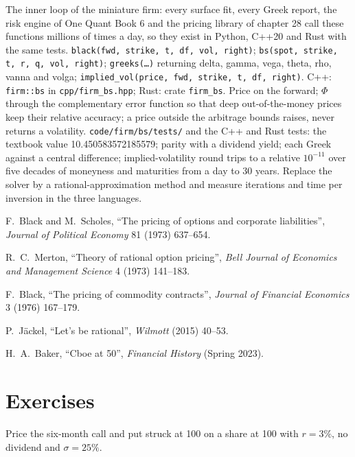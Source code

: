 \begin{build}
 The inner loop of the miniature firm: every surface fit, every
Greek report, the risk engine of One Quant Book 6 and the pricing library of
chapter 28 call these functions millions of times a day, so they exist in
Python, C++20 and Rust with the same tests.
 \texttt{black(fwd, strike, t, df, vol, right)};
\texttt{bs(spot, strike, t, r, q, vol, right)}; \texttt{greeks(\ldots)} returning
delta, gamma, vega, theta, rho, vanna and volga;
\texttt{implied\_vol(price, fwd, strike, t, df, right)}. C++:
\texttt{firm::bs} in \texttt{cpp/firm\_bs.hpp}; Rust: crate \texttt{firm\_bs}.
 Price on the forward; $\Phi$ through the complementary error
function so that deep out-of-the-money prices keep their relative accuracy; a
price outside the arbitrage bounds raises, never returns a volatility.
 \texttt{code/firm/bs/tests/} and the C++ and Rust
tests: the textbook value 10.450583572185579; parity with a dividend yield; each
Greek against a central difference; implied-volatility round trips to a relative
$10^{-11}$ over five decades of moneyness and maturities from a day to 30 years.
 Replace the solver by a rational-approximation method and
measure iterations and time per inversion in the three languages.
\end{build}

\begin{omsources}
\item F.~Black and M.~Scholes, ``The pricing of options and corporate
liabilities'', \emph{Journal of Political Economy} 81 (1973) 637--654.
\item R.~C.~Merton, ``Theory of rational option pricing'', \emph{Bell Journal of
Economics and Management Science} 4 (1973) 141--183.
\item F.~Black, ``The pricing of commodity contracts'', \emph{Journal of
Financial Economics} 3 (1976) 167--179.
\item P.~Jäckel, ``Let's be rational'', \emph{Wilmott} (2015) 40--53.
\item H.~A.~Baker, ``Cboe at 50'', \emph{Financial History} (Spring 2023).
\end{omsources}

\section{Exercises}

\begin{exercise}[$\star$]\label{exo:dv:black-scholes-three-ways:1}
Price the six-month call and put struck at 100 on a share at 100 with $r=3\%$,
no dividend and $\sigma=25\%$.
\end{exercise}

